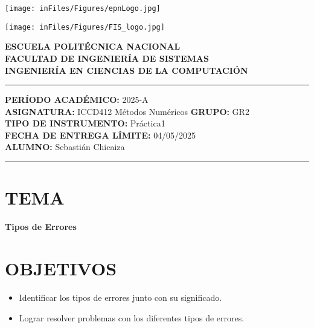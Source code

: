 \documentclass[12pt]{article}
\begin{document}
\begin{minipage}{0.45\textwidth}
    \texttt{[image: inFiles/Figures/epnLogo.jpg]}
\end{minipage}
\hfill
\begin{minipage}{0.45\textwidth}
    \raggedleft
    \texttt{[image: inFiles/Figures/FIS\_logo.jpg]}
\end{minipage}

\vspace{0.5cm}

\begin{center}
    \textbf{ESCUELA POLITÉCNICA NACIONAL}\\[0.2cm]
    \textbf{FACULTAD DE INGENIERÍA DE SISTEMAS}\\[0.2cm]
    \textbf{INGENIERÍA EN CIENCIAS DE LA COMPUTACIÓN}
\end{center}

\vspace{0.5cm}
\hrule
\vspace{0.5cm}

\noindent\textbf{PERÍODO ACADÉMICO:} 2025-A\\[0.2cm]
\noindent\textbf{ASIGNATURA:} ICCD412 Métodos Numéricos \hfill \textbf{GRUPO:} GR2\\[0.2cm]
\noindent\textbf{TIPO DE INSTRUMENTO:} Práctica1\\[0.2cm]
\noindent\textbf{FECHA DE ENTREGA LÍMITE:} {04/05/2025}\\[0.2cm]
\noindent\textbf{ALUMNO:} {Sebastián Chicaiza}

\vspace{0.5cm}
\hrule
\vspace{1cm}


\section*{TEMA}

\begin{center}
    \Large\textbf{Tipos de Errores}
\end{center}
\vspace{0.5cm}

\section*{OBJETIVOS}
\begin{itemize}
    \item {Identificar los tipos de errores junto con su significado.}
    \item {Lograr resolver problemas con los diferentes tipos de errores.}
\end{itemize}
\vspace{0.5cm}
\end{document}
